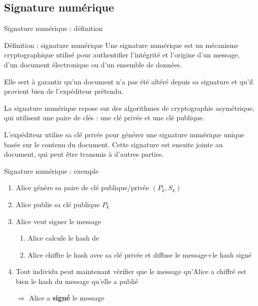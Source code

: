 \subsection{Signature numérique}

\begin{frame}{Signature numérique : définition}
  \begin{block}{Définition : signature numérique}
    Une signature numérique est un mécanisme cryptographique utilisé pour authentifier l'intégrité et l'origine d'un message, d'un document électronique ou d'un ensemble de données.

    Elle sert à garantir qu'un document n'a pas été altéré depuis sa signature et qu'il provient bien de l'expéditeur prétendu.

    La signature numérique repose sur des algorithmes de cryptographie asymétrique, qui utilisent une paire de clés : une clé privée et une clé publique.

    L'expéditeur utilise sa clé privée pour générer une signature numérique unique basée sur le contenu du document.
    Cette signature est ensuite jointe au document, qui peut être transmis à d'autres parties.
  \end{block}
\end{frame}

\begin{frame}{Signature numérique : exemple}
  \begin{enumerate}
    \item Alice génère sa paire de clé publique/privée $(P_k, S_k)$
    \item Alice publie sa clé publique $P_k$
    \item Alice veut signer le message 
          \begin{enumerate}
            \item Alice calcule le hash de 
            \item Alice chiffre le hash avec sa clé privée et diffuse le message+le hash signé
          \end{enumerate}
    \item Tout individu peut maintenant vérifier que le message qu'Alice a chiffré est bien le hash du message qu'elle a publié
    \item[$\Rightarrow$] Alice a \textbf{signé} le message 
  \end{enumerate}
\end{frame}